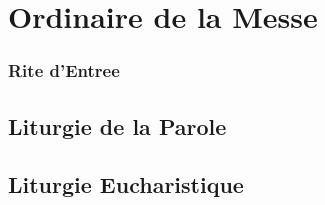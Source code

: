 \chapter[Ordinaire de la Messe][Ordinaire de la Messe]{Ordinaire de la Messe}
\begin{french}
\subsection*{Rite d’Entree}




\section[Liturgie de la Parole]{Liturgie de la Parole}


\newpage 





\newpage
{}








\newpage
{}


\newpage 





\newpage
{}








\newpage

\section[Liturgie Eucharistique]{Liturgie Eucharistique}



\end{french}
